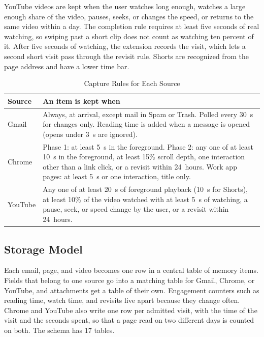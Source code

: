 \documentclass[conference]{IEEEtran}
\begin{document}
YouTube videos are kept when the user watches long enough, watches a large enough share of the video, pauses, seeks, or changes the speed, or returns to the same video within a day. The completion rule requires at least five seconds of real watching, so swiping past a short clip does not count as watching ten percent of it. After five seconds of watching, the extension records the visit, which lets a second short visit pass through the revisit rule. Shorts are recognized from the page address and have a lower time bar.

\begin{table}[t]
\caption{Capture Rules for Each Source}
\label{tab:gates}
\centering
\renewcommand{\arraystretch}{1.15}
\begin{tabular}{|>{\raggedright\arraybackslash}p{1.35cm}|>{\raggedright\arraybackslash}p{6.2cm}|}
\hline
\textbf{Source} & \textbf{An item is kept when} \\
\hline
Gmail & Always, at arrival, except mail in Spam or Trash. Polled every 30~s for changes only. Reading time is added when a message is opened (opens under 3~s are ignored). \\
\hline
Chrome & Phase 1: at least 5~s in the foreground. Phase 2: any one of at least 10~s in the foreground, at least 15\% scroll depth, one interaction other than a link click, or a revisit within 24~hours. Work app pages: at least 5~s or one interaction, title only. \\
\hline
YouTube & Any one of at least 20~s of foreground playback (10~s for Shorts), at least 10\% of the video watched with at least 5~s of watching, a pause, seek, or speed change by the user, or a revisit within 24~hours. \\
\hline
\end{tabular}
\end{table}

\subsection{Storage Model}
Each email, page, and video becomes one row in a central table of memory items. Fields that belong to one source go into a matching table for Gmail, Chrome, or YouTube, and attachments get a table of their own. Engagement counters such as reading time, watch time, and revisits live apart because they change often. Chrome and YouTube also write one row per admitted visit, with the time of the visit and the seconds spent, so that a page read on two different days is counted on both. The schema has 17 tables.
\end{document}
